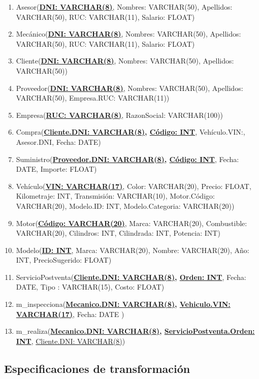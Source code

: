 \documentclass[12pt]{article}
\begin{document}
\begin{enumerate}
\item Asesor(\textbf{\underline{DNI: VARCHAR(8)}}, Nombres: VARCHAR(50), Apellidos: VARCHAR(50), RUC: VARCHAR(11), Salario: FLOAT)
\item Mecánico(\textbf{\underline{DNI: VARCHAR(8)}}, Nombres: VARCHAR(50), Apellidos: VARCHAR(50), RUC: VARCHAR(11), Salario: FLOAT)
\item Cliente(\textbf{\underline{DNI: VARCHAR(8)}}, Nombres: VARCHAR(50), Apellidos: VARCHAR(50))
\item Proveedor(\textbf{\underline{DNI: VARCHAR(8)}}, Nombres: VARCHAR(50), Apellidos: VARCHAR(50), Empresa.RUC: VARCHAR(11))
\item Empresa(\textbf{\underline{RUC: VARCHAR(8)}}, RazonSocial: VARCHAR(100))
\item Compra(\textbf{\underline{Cliente.DNI: VARCHAR(8)}, \underline{Código: INT}}, Vehículo.VIN:, Asesor.DNI, Fecha: DATE)
\item Suministro(\textbf{\underline{Proveedor.DNI: VARCHAR(8)}, \underline{Código: INT}}, Fecha: DATE, Importe: FLOAT)
\item Vehículo(\textbf{\underline{VIN: VARCHAR(17)}}, Color: VARCHAR(20), Precio: FLOAT, Kilometraje: INT, Transmisión: VARCHAR(10), Motor.Código: VARCHAR(20), Modelo.ID: INT, Modelo.Categoria: VARCHAR(20))
\item Motor(\textbf{\underline{Código: VARCHAR(20)}}, Marca: VARCHAR(20), Combustible: VARCHAR(20), Cilindros: INT, Cilindrada: INT, Potencia: INT)
\item Modelo(\textbf{\underline{ID: INT}}, Marca: VARCHAR(20), Nombre: VARCHAR(20), Año: INT, PrecioSugerido: FLOAT)
\item ServicioPostventa(\textbf{\underline{Cliente.DNI: VARCHAR(8)}, \underline{Orden: INT}}, Fecha: DATE, Tipo : VARCHAR(15), Costo: FLOAT)
\item m\_inspecciona(\textbf{\underline{Mecanico.DNI: VARCHAR(8)}, \underline{Vehiculo.VIN: VARCHAR(17)}}, Fecha: DATE )
\item m\_realiza(\textbf{\underline{Mecanico.DNI: VARCHAR(8)}, \underline{ServicioPostventa.Orden: INT}}, \underline{Cliente.DNI: VARCHAR(8)})
\end{enumerate}

\subsection{Especificaciones de transformaci\'on}
\end{document}
